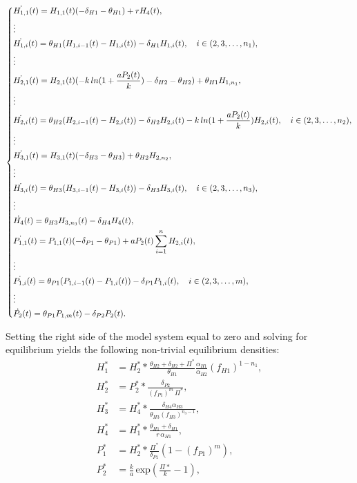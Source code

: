 \documentclass[12pt,a4paper,onecolumn]{article}
\begin{document}
\begin{equation}
\begin{dcases}
\dot{H_{1,1}}(t) = H_{1,1}(t)(- \delta_{H1} - \theta_{H1}) + r H_4(t), \\
\vdots \\
\dot{H_{1,i}}(t) = \theta_{H1}(H_{1,i-1}(t) - H_{1,i}(t)) - \delta_{H1} H_{1,i}(t), \quad i \in (2, 3, \dots, n_1), \\
\vdots \\
\dot{H_{2,1}}(t) = H_{2,1}(t)(-k\,ln(1+\frac{a P_2(t)}{k}) - \delta_{H2} - \theta_{H2}) + \theta_{H1} H_{1,n_1},  \\
\vdots \\
\dot{H_{2,i}}(t) = \theta_{H2}(H_{2,i-1}(t) - H_{2,i}(t)) - \delta_{H2} H_{2,i}(t) -k\,ln(1+\frac{a P_2(t)}{k})H_{2,i}(t), \quad i \in (2, 3, \dots, n_2), \\
\vdots \\
\dot{H_{3,1}}(t) = H_{3,1}(t)(- \delta_{H3} - \theta_{H3}) + \theta_{H2} H_{2,n_2}, \\
\vdots \\
\dot{H_{3,i}}(t) = \theta_{H3}(H_{3,i-1}(t) - H_{3,i}(t)) - \delta_{H3} H_{3,i}(t), \quad i \in (2, 3, \dots, n_3), \\
\vdots \\
\dot{H_{4}}(t) = \theta_{H3} H_{3,n_3}(t) - \delta_{H4} H_{4}(t), \\
\dot{P_{1,1}}(t) = P_{1,1}(t)(- \delta_{P1} - \theta_{P1}) + a P_2(t) \sum_{i=1}^{n} H_{2,i}(t), \\
\vdots \\
\dot{P_{1,i}}(t) = \theta_{P1}(P_{1,i-1}(t) - P_{1,i}(t)) - \delta_{P1} P_{1,i}(t), \quad i \in (2, 3, \dots, m), \\
\vdots \\
\dot{P_{2}}(t) = \theta_{P1} P_{1,m}(t) - \delta_{P2} P_{2}(t). \\
\end{dcases}
\end{equation}

Setting the right side of the model system equal to zero and solving for equilibrium yields the following non-trivial equilibrium densities:
 \begin{align}
  H_1^* &= H_2^* * \frac{\theta_{H2}+\delta_{H2}+\Pi^*}{\theta_{H1}} \frac{\alpha_{H1}}{\alpha_{H2}} (f_{H1})^{1-n_1}, \nonumber \\
  H_2^* &= P_2^* * \frac{\delta_{P2}}{(f_{P1})^{m} \, \Pi^*}, \nonumber \\
  H_3^* &= H_4^* * \frac{\delta_{H4} \alpha_{H3}}{\theta_{H3}(f_{H3})^{n_3-1}},  \nonumber \\
  H_4^* &= H_1^* * \frac{\theta_{H1}+\delta_{H1}}{r \, \alpha_{H1}},  \\
  P_1^* &= H_2^* * \frac{\Pi^*}{\delta_{P1}}(1-(f_{P1})^{m}), \nonumber \\
  P_2^* &= \frac{k}{a} \, \text{exp}(\frac{\Pi*}{k}-1), \nonumber 
\end{align}
\end{document}
